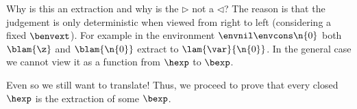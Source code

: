 Why is this an extraction and why is the $\rhd$ not a $\lhd$?
The reason is that the judgement is only deterministic when viewed from right to left (considering a fixed $\benvext$).
For example in the environment $\envnil \envcons \n{0}$ both $\blam{\z}$ and $\blam{\n{0}}$ extract to $\lam{\var}{\n{0}}$.
In the general case we cannot view it as a function from $\hexp$ to $\bexp$.

Even so we still want to translate!
Thus, we proceed to prove that every closed $\hexp$ is the extraction of some $\bexp$.
